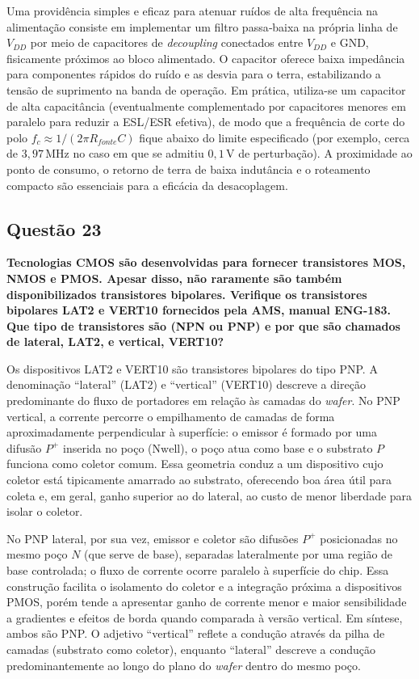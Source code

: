 \documentclass[12pt,a4paper]{article}
\begin{document}
Uma providência simples e eficaz para atenuar ruídos de alta frequência na alimentação consiste em implementar um filtro passa‑baixa na própria linha de $V_{DD}$ por meio de capacitores de \textit{decoupling} conectados entre $V_{DD}$ e GND, fisicamente próximos ao bloco alimentado. O capacitor oferece baixa impedância para componentes rápidos do ruído e as desvia para o terra, estabilizando a tensão de suprimento na banda de operação. Em prática, utiliza-se um capacitor de alta capacitância (eventualmente complementado por capacitores menores em paralelo para reduzir a ESL/ESR efetiva), de modo que a frequência de corte do polo $f_c \approx 1/(2\pi R_{fonte} C)$ fique abaixo do limite especificado (por exemplo, cerca de $3{,}97\,\text{MHz}$ no caso em que se admitiu $0{,}1$\,V de perturbação). A proximidade ao ponto de consumo, o retorno de terra de baixa indutância e o roteamento compacto são essenciais para a eficácia da desacoplagem.

\subsection*{Questão 23}
\begin{BoxQ}
	\textbf{Tecnologias CMOS são desenvolvidas para fornecer transistores MOS, NMOS e PMOS. Apesar disso, não raramente são também disponibilizados transistores bipolares. Verifique os transistores bipolares LAT2 e VERT10 fornecidos pela AMS, manual ENG-183. Que tipo de transistores são (NPN ou PNP) e por que são chamados de lateral, LAT2, e vertical, VERT10?}
\end{BoxQ}

Os dispositivos LAT2 e VERT10 são transistores bipolares do tipo PNP. A denominação “lateral” (LAT2) e “vertical” (VERT10) descreve a direção predominante do fluxo de portadores em relação às camadas do \textit{wafer}. No PNP vertical, a corrente percorre o empilhamento de camadas de forma aproximadamente perpendicular à superfície: o emissor é formado por uma difusão $P^+$ inserida no poço ($\text{Nwell}$), o poço atua como base e o substrato $P$ funciona como coletor comum. Essa geometria conduz a um dispositivo cujo coletor está tipicamente amarrado ao substrato, oferecendo boa área útil para coleta e, em geral, ganho superior ao do lateral, ao custo de menor liberdade para isolar o coletor.

No PNP lateral, por sua vez, emissor e coletor são difusões $P^+$ posicionadas no mesmo poço $N$ (que serve de base), separadas lateralmente por uma região de base controlada; o fluxo de corrente ocorre paralelo à superfície do chip. Essa construção facilita o isolamento do coletor e a integração próxima a dispositivos PMOS, porém tende a apresentar ganho de corrente menor e maior sensibilidade a gradientes e efeitos de borda quando comparada à versão vertical. Em síntese, ambos são PNP. O adjetivo “vertical” reflete a condução através da pilha de camadas (substrato como coletor), enquanto “lateral” descreve a condução predominantemente ao longo do plano do \textit{wafer} dentro do mesmo poço.
\end{document}
